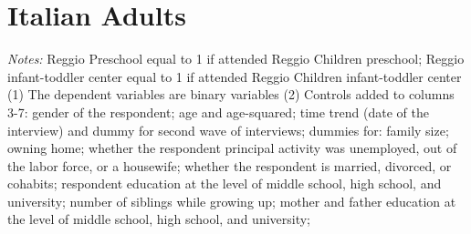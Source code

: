 \documentclass[12pt,english]{article}
\begin{document}
\section{Italian Adults}
 {

\FloatBarrier
\begin{table}[htb!]
\begin{small}
.tex}
\end{small}
   \begin{tablenotes}
      \footnotesize
      \item \emph{Notes:} Reggio Preschool equal to 1 if attended Reggio Children preschool; Reggio infant-toddler center equal to 1 if attended Reggio Children infant-toddler center (1) The dependent variables are binary variables (2) Controls added to columns 3-7: gender of the respondent; age and age-squared; time trend (date of the interview) and dummy for second wave of interviews; dummies for: family size; owning home; whether the respondent principal activity was unemployed, out of the labor force, or a housewife; whether the respondent is married, divorced, or cohabits; respondent education at the level of middle school, high school, and university; number of siblings while growing up; mother and father education at the level of middle school, high school, and university; 
    \end{tablenotes}
\end{table}

}
\end{document}
